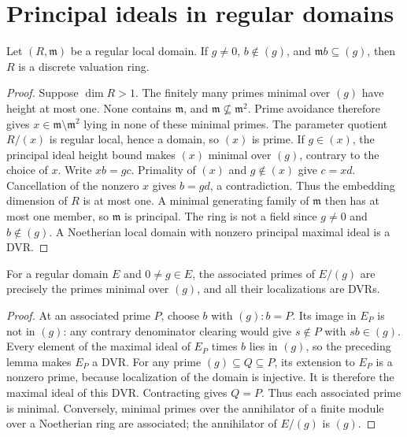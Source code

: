 \section{Principal ideals in regular domains}

\begin{lemma}\label{lem:regular-principal-associated-dvr}
\leanok
Let $(R,\mathfrak m)$ be a regular local domain. If $g\ne0$, $b\notin(g)$,
and $\mathfrak m b\subseteq(g)$, then $R$ is a discrete valuation ring.
\end{lemma}
\begin{proof}
Suppose $\dim R>1$. The finitely many primes minimal over $(g)$ have
height at most one. None contains $\mathfrak m$, and
$\mathfrak m\not\subseteq\mathfrak m^2$. Prime avoidance therefore gives
$x\in\mathfrak m\setminus\mathfrak m^2$ lying in none of these minimal
primes. The parameter quotient $R/(x)$ is regular local, hence a domain,
so $(x)$ is prime. If $g\in(x)$, the principal ideal height bound makes
$(x)$ minimal over $(g)$, contrary to the choice of $x$. Write
$xb=gc$. Primality of $(x)$ and $g\notin(x)$ give $c=xd$.
Cancellation of the nonzero $x$ gives $b=gd$, a contradiction. Thus the
embedding dimension of $R$ is at most one. A minimal generating family
of $\mathfrak m$ then has at most one member, so $\mathfrak m$ is
principal. The ring is not a field since $g\ne0$ and $b\notin(g)$.
A Noetherian local domain with nonzero principal maximal ideal is a DVR.
\end{proof}

\begin{lemma}\label{lem:regular-principal-associated-minimal}
\leanok
{}
For a regular domain $E$ and $0\ne g\in E$, the associated primes of
$E/(g)$ are precisely the primes minimal over $(g)$, and all their
localizations are DVRs.
\end{lemma}
\begin{proof}
At an associated prime $P$, choose $b$ with $(g):b=P$. Its image in
$E_P$ is not in $(g)$: any contrary denominator clearing would give
$s\notin P$ with $sb\in(g)$. Every element of the maximal ideal of
$E_P$ times $b$ lies in $(g)$, so the preceding lemma makes $E_P$ a DVR.
For any prime $(g)\subseteq Q\subseteq P$, its extension to $E_P$ is a
nonzero prime, because localization of the domain is injective. It is
therefore the maximal ideal of this DVR. Contracting gives $Q=P$.
Thus each associated prime is minimal. Conversely, minimal primes over
the annihilator of a finite module over a Noetherian ring are associated;
the annihilator of $E/(g)$ is $(g)$.
\end{proof}

